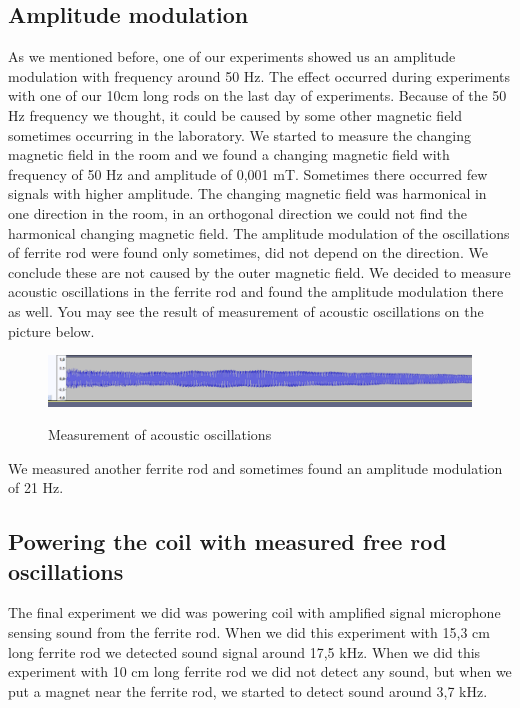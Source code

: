 \documentclass[10pt,a4paper]{article}
\begin{document}
\subsection{Amplitude modulation}
As we mentioned before, one of our experiments showed us an amplitude modulation with frequency around 50 Hz. The effect occurred during experiments with one of our 10cm long rods on the last day of experiments. Because of the 50 Hz frequency we thought, it could be caused by some other magnetic field sometimes occurring in the laboratory. We started to measure the changing magnetic field in the room and we found a changing magnetic field with frequency of 50 Hz and amplitude of 0,001 mT. Sometimes there occurred few signals with higher amplitude. The changing magnetic field was harmonical in one direction in the room, in an orthogonal direction we could not find the harmonical changing magnetic field. The amplitude modulation of the oscillations of ferrite rod were found only sometimes, did not depend on the direction. We conclude these are not caused by the outer magnetic field. We decided to measure acoustic oscillations in the ferrite rod and found the amplitude modulation there as well. You may see the result of measurement of acoustic oscillations on the picture below.

\begin{figure}[H]
\centering
    \includegraphics[width=\textwidth]{ampl.png}
    \label{fig:uvod}
    \caption{Measurement of acoustic oscillations}
\end{figure}

We measured another ferrite rod and sometimes found an amplitude modulation of 21 Hz.

\subsection{Powering the coil with measured free rod oscillations}
The final experiment we did was powering coil with amplified signal microphone sensing sound from the ferrite rod. When we did this experiment with 15,3 cm long ferrite rod we detected sound signal around 17,5 kHz. When we did this experiment with 10 cm long ferrite rod we did not detect any sound, but when we put a magnet near the ferrite rod, we started to detect sound around 3,7 kHz.
\end{document}

